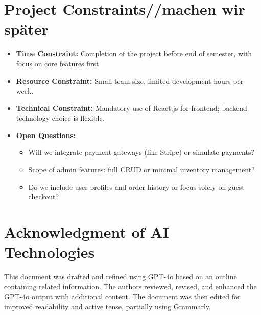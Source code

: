 \documentclass[a4paper,12pt]{article}
\begin{document}
	\section{Project Constraints//machen wir später }
	\begin{itemize}
		\item \textbf{Time Constraint:} Completion of the project before end of semester, with focus on core features first.
		\item \textbf{Resource Constraint:} Small team size, limited development hours per week.
		\item \textbf{Technical Constraint:} Mandatory use of React.js for frontend; backend technology choice is flexible.
		\item \textbf{Open Questions:}
		\begin{itemize}
			\item Will we integrate payment gateways (like Stripe) or simulate payments?
			\item Scope of admin features: full CRUD or minimal inventory management?
			\item Do we include user profiles and order history or focus solely on guest checkout?
		\end{itemize}
	\end{itemize}
	
	\section{Acknowledgment of AI Technologies}
	This document was drafted and refined using GPT-4o based on an outline containing related information. The authors reviewed, revised, and enhanced the GPT-4o output with additional content. The document was then edited for improved readability and active tense, partially using Grammarly.
	
\end{document}
